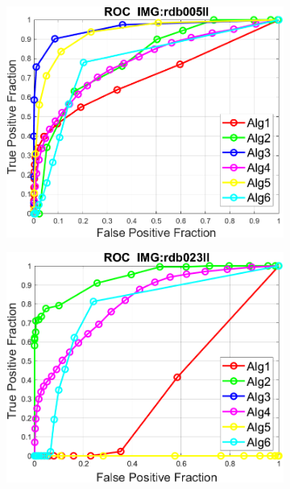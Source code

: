 \documentclass[a4paper, 11pt]{article}
\begin{document}
\begin{figure}[hbt!]
\begin{subfigure}{.4\linewidth}
  \includegraphics[width=\linewidth]{src/rdb005ll.png}
  \caption{}
  \label{MLEDdet}
\end{subfigure}\hfill %
\begin{subfigure}{.4\linewidth}
  \includegraphics[width=\linewidth]{src/rdb023ll.png}
  \caption{}
  \label{energydetPSK}
\end{subfigure}


\end{figure}
\end{document}
